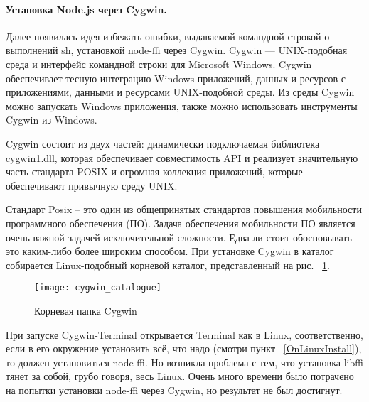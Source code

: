 \paragraph{Установка Node.js через Cygwin.}
Далее появилась идея избежать ошибки, выдаваемой командной строкой о выполнений sh, установкой node-ffi через Cygwin. 
Cygwin — UNIX-подобная среда и интерфейс командной строки для Microsoft Windows. Cygwin обеспечивает тесную интеграцию Windows приложений, данных и ресурсов с приложениями, данными и ресурсами UNIX-подобной среды. Из среды Cygwin можно запускать Windows приложения, также можно использовать инструменты Cygwin из Windows.

Cygwin состоит из двух частей: динамически подключаемая библиотека cygwin1.dll, которая обеспечивает совместимость API и реализует значительную часть стандарта POSIX и огромная коллекция приложений, которые обеспечивают привычную среду UNIX.

Стандарт Posix – это один из общепринятых стандартов повышения мобильности программного обеспечения (ПО).  Задача обеспечения мобильности ПО является очень важной задачей исключительной сложности. Едва ли стоит обосновывать это каким-либо более широким способом.
При установке Cygwin в каталог собирается Linux-подобный корневой каталог, представленный на рис. ~\ref{cygwin_catalogue}.
\begin{figure}[!ht]
	\begin{center}
		\texttt{[image: cygwin\_catalogue]}
	\end{center}
	\caption{Корневая папка Cygwin}
	\label{cygwin_catalogue}
\end{figure}

	При запуске Cygwin-Terminal открывается Terminal как в Linux, соответственно, если в его окружение установить всё, что надо (смотри пункт ~\ref{OnLinuxInstall}), то должен установиться node-ffi. Но возникла проблема с тем, что установка libffi тянет за собой, грубо говоря, весь Linux. Очень много времени было потрачено на попытки установки node-ffi через Cygwin, но результат не был достигнут.
